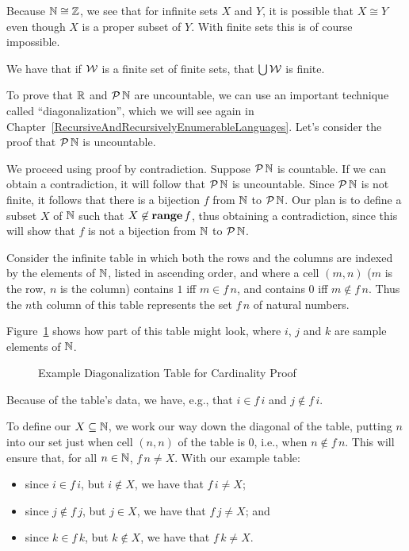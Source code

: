 Because $\mathbb{N}\cong\mathbb{Z}$, we see that for infinite sets $X$ and $Y$,
it is possible that $X\cong Y$ even though $X$ is a proper subset of $Y$.
With finite sets this is of course impossible.

We have that if $\cal W$ is a finite set of finite sets, that
$\bigcup{\cal W}$ is finite.

To prove that $\mathbb{R}$ and ${\cal P} \,\mathbb{N}$ are uncountable, we can
use an important technique called ``diagonalization'',
%
which we will see again in
Chapter~\ref{RecursiveAndRecursivelyEnumerableLanguages}.  Let's consider
the proof that ${\cal P} \,\mathbb{N}$ is uncountable.

We proceed using proof by contradiction.
%
%
Suppose ${\cal P} \,\mathbb{N}$ is countable.  If we can obtain a
contradiction, it will follow that ${\cal P} \,\mathbb{N}$ is uncountable.
Since ${\cal P} \,\mathbb{N}$ is not finite, it follows that there is a
bijection $f$ from $\mathbb{N}$ to ${\cal P} \,\mathbb{N}$.  Our plan is to define
a subset $X$ of $\mathbb{N}$ such that $X\not\in\mathbf{range}\,f$, thus obtaining
a contradiction, since this will show that $f$ is not a bijection from
$\mathbb{N}$ to ${\cal P} \,\mathbb{N}$.

Consider the infinite table in which both the rows and the columns are
indexed by the elements of $\mathbb{N}$, listed in ascending order, and
where a cell $(m, n)$ ($m$ is the row, $n$ is the column) contains
$1$ iff $m\in f\,n$, and contains $0$ iff $m\not\in f\,n$.  Thus the
$n$th column of this table represents the set $f\,n$ of natural
numbers.

Figure~\ref{DiagCard} shows how part of this table might look, where
$i$, $j$ and $k$ are sample elements of $\mathbb{N}$.
\begin{figure}
\begin{center}

\end{center}
\caption{Example Diagonalization Table for Cardinality Proof}
\label{DiagCard}
\end{figure}
Because of the table's data, we have, e.g., that $i\in f\,i$
and $j\not\in f\,i$.

To define our $X\subseteq\mathbb{N}$, we work our way down the diagonal of the
table, putting $n$ into our set just when cell $(n,n)$ of the
table is $0$, i.e., when $n\not\in f\,n$.  This will ensure that, for
all $n\in\mathbb{N}$, $f\,n\neq X$.
With our example table:
\begin{itemize}
\item since $i\in f\,i$, but $i\not\in X$, we have that $f\,i\neq X$;

\item since $j\not\in f\,j$, but $j\in X$, we have that $f\,j\neq X$; and

\item since $k\in f\,k$, but $k\not\in X$, we have that $f\,k\neq X$.
\end{itemize}

